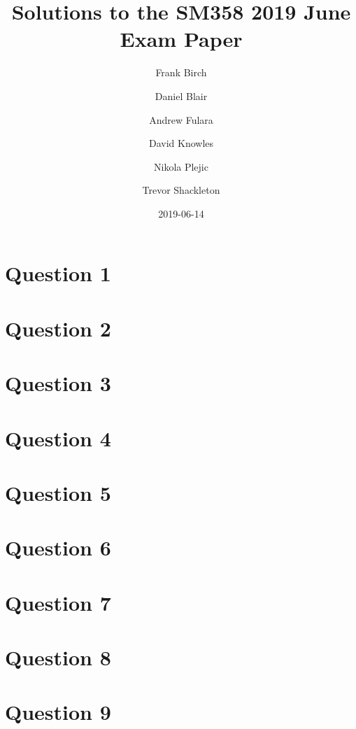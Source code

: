 \documentclass{article}
\title{Solutions to the SM358 2019 June Exam Paper}
\author{
    Frank Birch
    \and
    Daniel Blair
    \and
    Andrew Fulara
    \and
    David Knowles
    \and
    Nikola Plejic
    \and
    Trevor Shackleton
}
\date{2019-06-14}
\begin{document}
\begin{titlingpage}
    \maketitle
\end{titlingpage}

\fancyhf{}


\section{Question 1}


\section{Question 2}


\section{Question 3}


\section{Question 4}


\section{Question 5}


\section{Question 6}


\section{Question 7}


\section{Question 8}


\section{Question 9}

\end{document}
